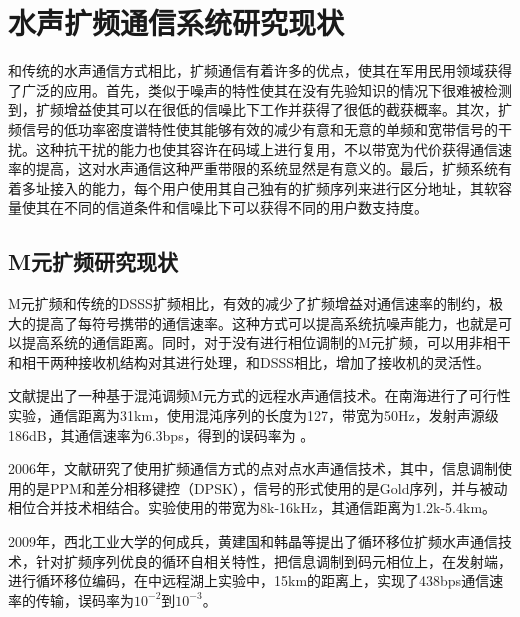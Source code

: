 \section{水声扩频通信系统研究现状}
%
和传统的水声通信方式相比，扩频通信有着许多的优点，使其在军用民用领域获得了广泛的应用。首先，类似于噪声的特性使其在没有先验知识的情况下很难被检测到，扩频增益使其可以在很低的信噪比下工作并获得了很低的截获概率。其次，扩频信号的低功率密度谱特性使其能够有效的减少有意和无意的单频和宽带信号的干扰。这种抗干扰的能力也使其容许在码域上进行复用，不以带宽为代价获得通信速率的提高，这对水声通信这种严重带限的系统显然是有意义的。最后，扩频系统有着多址接入的能力，每个用户使用其自己独有的扩频序列来进行区分地址，其软容量使其在不同的信道条件和信噪比下可以获得不同的用户数支持度。
\subsection{M元扩频研究现状}
M元扩频和传统的DSSS扩频相比，有效的减少了扩频增益对通信速率的制约，极大的提高了每符号携带的通信速率。这种方式可以提高系统抗噪声能力，也就是可以提高系统的通信距离。同时，对于没有进行相位调制的M元扩频，可以用非相干和相干两种接收机结构对其进行处理，和DSSS相比，增加了接收机的灵活性。

文献\cite{王海斌2004混沌调频}提出了一种基于混沌调频M元方式的远程水声通信技术。在南海进行了可行性实验，通信距离为31km，使用混沌序列的长度为127，带宽为50Hz，发射声源级186dB，其通信速率为6.3bps，得到的误码率为 。

2006年，文献\cite{hursky2006point}研究了使用扩频通信方式的点对点水声通信技术，其中，信息调制使用的是PPM和差分相移键控（DPSK），信号的形式使用的是Gold序列，并与被动相位合并技术相结合。实验使用的带宽为8k-16kHz，其通信距离为1.2k-5.4km。

2009年，西北工业大学的何成兵，黄建国和韩晶等提出了循环移位扩频水声通信技术，针对扩频序列优良的循环自相关特性，把信息调制到码元相位上，在发射端，进行循环移位编码，在中远程湖上实验中，15km的距离上，实现了438bps通信速率的传输，误码率为$10^{-2}$到$10^{-3}$。

